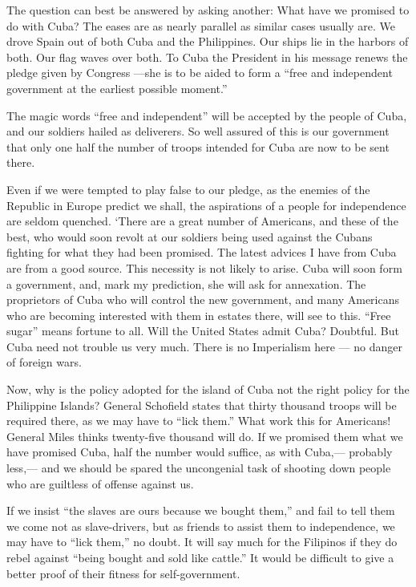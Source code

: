 \documentclass[11pt,openany]{book}
\begin{document}
The question can best be answered by asking another: What have we promised to do with Cuba? The eases are as nearly parallel as similar cases usually are. We drove Spain out of both Cuba and the Philippines. Our ships lie in the harbors of both. Our flag waves over both. To Cuba the President in his message renews the pledge given by Congress ---she is to be aided to form a ``free and independent government at the earliest possible moment.''

The magic words ``free and independent'' will be accepted by the people of Cuba, and our soldiers hailed as deliverers. So well assured of this is our government that only one half the number of troops intended for Cuba are now to be sent there.

Even if we were tempted to play false to our pledge, as the enemies of the Republic in Europe predict we shall, the aspirations of a people for independence are seldom quenched. `There are a great number of Americans, and these of the best, who would soon revolt at our soldiers being used against the Cubans fighting for what they had been promised. The latest advices I have from Cuba are from a good source. This necessity is not likely to arise. Cuba will soon form a government, and, mark my prediction, she will ask for annexation. The proprietors of Cuba who will control the new government, and many Americans who are becoming interested with them in estates there, will see to this. ``Free sugar'' means fortune to all. Will the United States admit Cuba? Doubtful. But Cuba need not trouble us very much. There is no Imperialism here --- no danger of foreign wars.

Now, why is the policy adopted for the island of Cuba not the right policy for the Philippine Islands? General Schofield states that thirty thousand troops will be required there, as we may have to ``lick them.'' What work this for Americans! General Miles thinks twenty-five thousand will do. If we promised them what we have promised Cuba, half the number would suffice, as with Cuba,--- probably less,--- and we should be spared the uncongenial task of shooting down people who are guiltless of offense against us.

If we insist ``the slaves are ours because we bought them,'' and fail to tell them we come not as slave-drivers, but as friends to assist them to independence, we may have to ``lick them,'' no doubt. It will say much for the Filipinos if they do rebel against ``being bought and sold like cattle.'' It would be difficult to give a better proof of their fitness for self-government.
\end{document}

